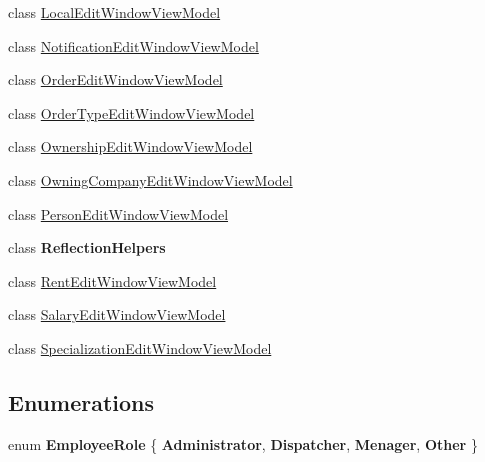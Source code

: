 \begin{DoxyCompactItemize}
class \hyperlink{class_baudi_1_1_client_1_1_view_models_1_1_edit_window_view_models_1_1_local_edit_window_view_model}{Local\+Edit\+Window\+View\+Model}
\item 
class \hyperlink{class_baudi_1_1_client_1_1_view_models_1_1_edit_window_view_models_1_1_notification_edit_window_view_model}{Notification\+Edit\+Window\+View\+Model}
\item 
class \hyperlink{class_baudi_1_1_client_1_1_view_models_1_1_edit_window_view_models_1_1_order_edit_window_view_model}{Order\+Edit\+Window\+View\+Model}
\item 
class \hyperlink{class_baudi_1_1_client_1_1_view_models_1_1_edit_window_view_models_1_1_order_type_edit_window_view_model}{Order\+Type\+Edit\+Window\+View\+Model}
\item 
class \hyperlink{class_baudi_1_1_client_1_1_view_models_1_1_edit_window_view_models_1_1_ownership_edit_window_view_model}{Ownership\+Edit\+Window\+View\+Model}
\item 
class \hyperlink{class_baudi_1_1_client_1_1_view_models_1_1_edit_window_view_models_1_1_owning_company_edit_window_view_model}{Owning\+Company\+Edit\+Window\+View\+Model}
\item 
class \hyperlink{class_baudi_1_1_client_1_1_view_models_1_1_edit_window_view_models_1_1_person_edit_window_view_model}{Person\+Edit\+Window\+View\+Model}
\item 
class {\bfseries Reflection\+Helpers}
\item 
class \hyperlink{class_baudi_1_1_client_1_1_view_models_1_1_edit_window_view_models_1_1_rent_edit_window_view_model}{Rent\+Edit\+Window\+View\+Model}
\item 
class \hyperlink{class_baudi_1_1_client_1_1_view_models_1_1_edit_window_view_models_1_1_salary_edit_window_view_model}{Salary\+Edit\+Window\+View\+Model}
\item 
class \hyperlink{class_baudi_1_1_client_1_1_view_models_1_1_edit_window_view_models_1_1_specialization_edit_window_view_model}{Specialization\+Edit\+Window\+View\+Model}
\end{DoxyCompactItemize}
\subsection*{Enumerations}
\begin{DoxyCompactItemize}
\item 
\hypertarget{namespace_baudi_1_1_client_1_1_view_models_1_1_edit_window_view_models_a1e2d8db84f4ba2514ef82b91ae9faea2}{}enum {\bfseries Employee\+Role} \{ {\bfseries Administrator}, 
{\bfseries Dispatcher}, 
{\bfseries Menager}, 
{\bfseries Other}
 \}\label{namespace_baudi_1_1_client_1_1_view_models_1_1_edit_window_view_models_a1e2d8db84f4ba2514ef82b91ae9faea2}

\end{DoxyCompactItemize}
